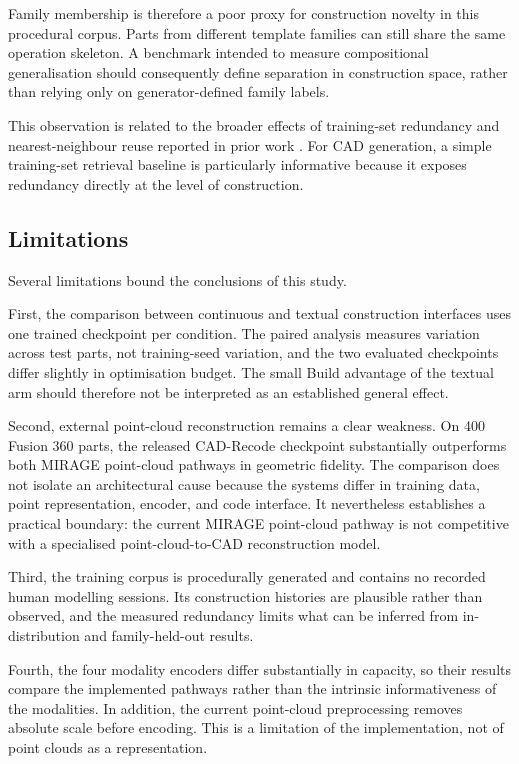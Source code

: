 \documentclass[preprint,12pt]{elsarticle}
\begin{document}
Family membership is therefore a poor proxy for construction novelty in this
procedural corpus. Parts from different template families can still share the
same operation skeleton. A benchmark intended to measure compositional
generalisation should consequently define separation in construction space,
rather than relying only on generator-defined family labels.

This observation is related to the broader effects of training-set redundancy
and nearest-neighbour reuse reported in prior work
\cite{lee2022dedup,khandelwal2020knnlm}. For CAD generation, a simple
training-set retrieval baseline is particularly informative because it exposes
redundancy directly at the level of construction.


\subsection{Limitations}
\label{sec:discussion_limitations}

Several limitations bound the conclusions of this study.

First, the comparison between continuous and textual construction interfaces
uses one trained checkpoint per condition. The paired analysis measures
variation across test parts, not training-seed variation, and the two evaluated
checkpoints differ slightly in optimisation budget. The small Build advantage
of the textual arm should therefore not be interpreted as an established
general effect.

Second, external point-cloud reconstruction remains a clear weakness. On 400
Fusion 360 parts, the released CAD-Recode checkpoint
\cite{rukhovich2025cadrecode} substantially outperforms both MIRAGE
point-cloud pathways in geometric fidelity. The comparison does not isolate an
architectural cause because the systems differ in training data, point
representation, encoder, and code interface. It nevertheless establishes a
practical boundary: the current MIRAGE point-cloud pathway is not competitive
with a specialised point-cloud-to-CAD reconstruction model.

Third, the training corpus is procedurally generated and contains no recorded
human modelling sessions. Its construction histories are plausible rather than
observed, and the measured redundancy limits what can be inferred from
in-distribution and family-held-out results.

Fourth, the four modality encoders differ substantially in capacity, so their
results compare the implemented pathways rather than the intrinsic
informativeness of the modalities. In addition, the current point-cloud
preprocessing removes absolute scale before encoding. This is a limitation of
the implementation, not of point clouds as a representation.
\end{document}
